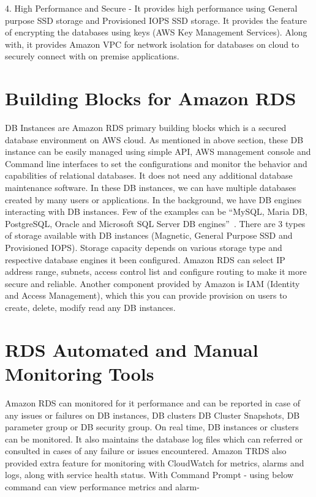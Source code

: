 4. High Performance and Secure - It provides high performance using General 
purpose SSD storage and Provisioned IOPS SSD storage. It provides the feature 
of encrypting the databases using keys (AWS Key Management Services). 
Along with, it provides Amazon VPC for network isolation for databases on 
cloud to securely connect with on premise applications.
 

\section{Building Blocks for Amazon RDS}

DB Instances are Amazon RDS primary building blocks which is a secured database 
environment on AWS cloud. As mentioned in above section, these DB instance can 
be easily managed using simple API, AWS management console and Command line 
interfaces to set the configurations and monitor the behavior and capabilities 
of relational databases. It does not need any additional database maintenance 
software. In these DB instances, we can have multiple databases created by many 
users or 
applications.
In the background, we have DB engines interacting with DB instances. Few of the 
examples can be ``MySQL, Maria DB, PostgreSQL, Oracle and Microsoft SQL Server DB 
engines''~\cite{hid-sp18-520-amazonrds}.
There are 3 types of storage available with DB instances (Magnetic, General 
Purpose SSD and Provisioned IOPS).
Storage capacity depends on various storage type and respective database engines 
it been configured.
Amazon RDS can select IP address range, subnets, access control list and 
configure routing to make it more secure and reliable.
Another component provided by Amazon is IAM (Identity and Access Management), 
which this you can provide provision on users to create, delete, modify read 
any DB instances.

\section{RDS Automated and Manual Monitoring Tools}

Amazon RDS can monitored for it performance and can be reported in case of 
any issues or failures on DB instances, DB clusters DB Cluster Snapshots, DB 
parameter group or DB security group.
On real time, DB instances or clusters can be monitored. It also maintains the 
database log files which can referred or consulted in cases of any failure or 
issues encountered.
Amazon TRDS also provided extra feature for monitoring with CloudWatch for 
metrics, alarms and logs, along with service health status.
With Command Prompt - using below command can view performance metrics and 
alarm- 

